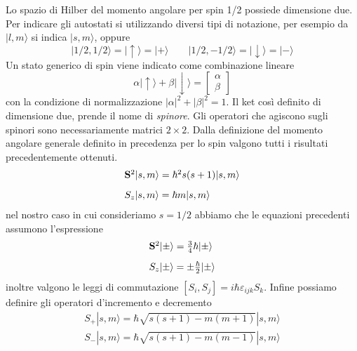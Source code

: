 Lo spazio di Hilber del momento angolare per spin 1/2 possiede dimensione due. Per indicare gli autostati si utilizzando diversi tipi di notazione, per esempio da $|l,m \rangle $ si indica $|s,m \rangle$, oppure 
\begin{equation*}
	|1/2,1/2 \rangle = | \uparrow  \rangle = |+ \rangle  \quad \quad |1/2,-1/2 \rangle = |\downarrow \rangle = |-\rangle 
\end{equation*}
 Un stato generico di spin viene indicato come combinazione lineare 
 \begin{equation}
 	\alpha |\uparrow \rangle + \beta |\downarrow \rangle = \left [\begin{array}{c}
 		\alpha \\
 		\beta
 	\end{array}\right ] 
 \end{equation}
con la condizione di normalizzazione $|\alpha|^2 + |\beta|^2 = 1$. Il ket cos\`i definito di dimensione due, prende il nome di \textit{spinore}. Gli operatori che agiscono sugli spinori sono necessariamente matrici $2 \times 2$. Dalla definizione del momento angolare generale definito in precedenza per lo spin valgono tutti i risultati precedentemente ottenuti.
\begin{equation*}
\begin{array}{l}
	\bold{S}^2|s,m \rangle  = \hbar^2s(s+1)|s,m \rangle \\[0.3cm]
	S_z|s,m \rangle = \hbar m|s,m \rangle 
\end{array}
\end{equation*}
nel nostro caso in cui consideriamo $s = 1/2$ abbiamo che le equazioni precedenti assumono l'espressione
\begin{equation}
\begin{array}{l}
	\bold{S}^2|\pm\rangle = \frac{3}{4}\hbar |\pm \rangle \\[0.3cm]
	S_z|\pm \rangle = \pm \frac{\hbar}{2}|\pm \rangle 
\end{array} 
\end{equation}
inoltre valgono le leggi di commutazione $[S_i,S_j] = i\hbar \varepsilon_{ijk}S_k$. Infine possiamo definire gli operatori d'incremento e decremento
\begin{equation}
	\begin{array}{l}
		S_+|s,m \rangle = \hbar \sqrt{s(s+1)-m(m+1)}|s,m \rangle \\[0.3cm]
		S_-|s,m \rangle = \hbar \sqrt{s(s+1)-m(m-1)}|s,m \rangle 
	\end{array}
\end{equation}
